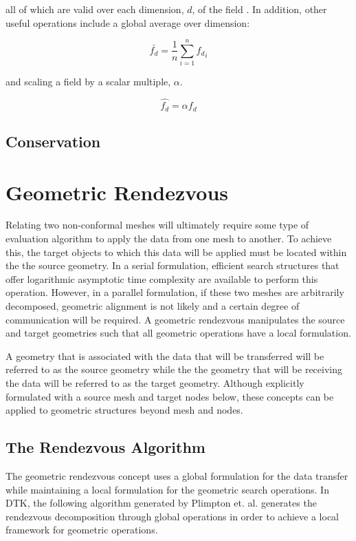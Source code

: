 \documentclass[letterpaper,12pt]{article}
\begin{document}
all of which are valid over each dimension, $d$, of the field
\cite{LeVeque_2007}. In addition, other useful operations include a
global average over dimension:

\begin{equation}
  \bar{f_d} = \frac{1}{n}\sum_{i=1}^n {f_d}_i
  \label{eq:average}
\end{equation}

and scaling a field by a scalar multiple, $\alpha$.

\begin{equation}
  \hat{f_d} = \alpha f_d
  \label{eq:field_scaling}
\end{equation}


\subsection{Conservation}

\clearpage

\section{Geometric Rendezvous}\label{sec:rendezvous}
Relating two non-conformal meshes will ultimately require some type of
evaluation algorithm to apply the data from one mesh to another. To
achieve this, the target objects to which this data will be applied
must be located within the the source geometry. In a serial
formulation, efficient search structures that offer logarithmic
asymptotic time complexity are available to perform this
operation. However, in a parallel formulation, if these two meshes are
arbitrarily decomposed, geometric alignment is not likely and a
certain degree of communication will be required. A geometric
rendezvous manipulates the source and target geometries such that all
geometric operations have a local formulation.

A geometry that is associated with the data that will be transferred
will be referred to as the source geometry while the the geometry that
will be receiving the data will be referred to as the target
geometry. Although explicitly formulated with a source mesh and target
nodes below, these concepts can be applied to geometric structures
beyond mesh and nodes.

\subsection{The Rendezvous Algorithm}\label{subsec:rendezvous_alg}
The geometric rendezvous concept uses a global formulation for the
data transfer while maintaining a local formulation for the geometric
search operations. In DTK, the following algorithm generated by
Plimpton et. al. \cite{Plimpton_2004} generates the rendezvous
decomposition through global operations in order to achieve a local
framework for geometric operations. 
\end{document}
